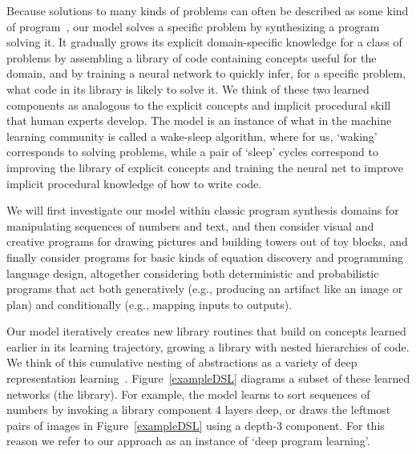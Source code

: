 \documentclass{article}
\begin{document}
Because solutions to many kinds of problems can often be described as
some kind of
program~\cite{lake2015human,Ullman2012,DBLP:journals/cogsr/SchmidK11},
our model solves a specific problem by synthesizing a program solving
it. It gradually grows its explicit domain-specific knowledge for a
class of problems by assembling a library of code containing concepts
useful for the domain, and by training a neural network to quickly
infer, for a specific problem, what code in its library is likely to
solve it. We think of these two learned components as analogous to the
explicit concepts and implicit procedural skill that human experts
develop.  The model is an instance of what in the machine learning
community is called a wake-sleep algorithm, where for us, `waking'
corresponds to solving problems, while a pair of `sleep' cycles
correspond to improving the library of explicit concepts and training
the neural net to improve implicit procedural knowledge of how to
write code.


We will first investigate our model within classic program
synthesis domains for manipulating sequences of numbers and text, and
then consider visual and creative programs for drawing pictures and
building towers out of toy blocks, and finally consider programs for basic kinds of equation discovery and programming language design, altogether considering both
deterministic and probabilistic programs that act both generatively
(e.g., producing an artifact like an image or plan) and conditionally
(e.g., mapping inputs to outputs).

Our model iteratively creates new library routines that build on
concepts learned earlier in its learning trajectory, growing a library with nested
hierarchies of code.  We think of this cumulative nesting of
abstractions as a variety of deep representation
learning~\cite{lecun2015deep}.  Figure~\ref{exampleDSL} diagrams a
subset of these learned networks (the library). For example, the model
learns to sort sequences of numbers by invoking a library component 4
layers deep, or draws the leftmost pairs of images in
Figure~\ref{exampleDSL} using a depth-3 component.  For this reason we
refer to our approach as an instance of `deep program learning'.
\end{document}
